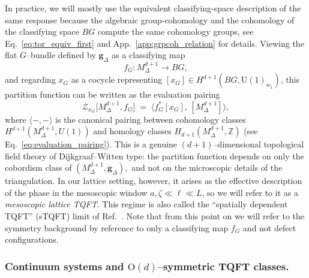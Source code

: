 \documentclass[aps,prx,reprint,superscriptaddress,twocolumn,amsmath,amssymb,amsfonts, nofootinbib]{revtex4-2}
\newcommand{\U}{\text{U}}
\theoremstyle{apsstyle}
\begin{document}
\bigskip 

In practice, we will mostly use the equivalent classifying-space description of the same response because the algebraic group-cohomology and the cohomology of the classifying space $BG$ compute the same cohomology groups, see Eq.~\ref{eq:tor_equiv_first} and App.~\ref{app:grpcoh_relation} for details.
Viewing the flat $G$–bundle defined by ${\mathbf g}_{\Delta}$ as a classifying map
\begin{equation*}
   f_G : M^{d+1}_{\Delta} \longrightarrow BG,
\end{equation*}
and regarding $x_G$ as a cocycle representing $[x_{G}]\in H^{d+1}(BG,\U(1)_{w_{1}})$, this partition function can be written as the evaluation pairing
\begin{equation*}    \mathcal{Z}_{x_G}\bigl[M^{d+1}_{\Delta}, f_{G}\bigr]
    \;=\;
    \big\langle f_G^{*}[x_G],\,[M^{d+1}_{\Delta}]\big\rangle,
\end{equation*}
where $\langle -,-\rangle$ is the canonical pairing between cohomology classes $H^{d+1}(M^{d+1}_{\Delta},U(1))$ and homology classes $H_{d+1}(M^{d+1}_{\Delta},\mathbb Z)$ (see Eq.~\ref{eq:evaluation_pairing}). This is a genuine $(d{+}1)$–dimensional topological field theory of Dijkgraaf–Witten type: the partition function depends on only the cobordism class of $(M^{d+1}_{\Delta},  {\mathbf g}_{\Delta}),$ and not on the microscopic details of the triangulation. In our lattice setting, however, it arises as the effective description of the phase in the mesoscopic window $a,\zeta \ll \ell \ll L$, so we will refer to it as a \emph{mesoscopic lattice TQFT}. This regime is also called the “spatially dependent TQFT” (sTQFT) limit of Ref.~\cite{ThorngrenElse}. Note that from this point on we will refer to the symmetry background by reference to only a classifying map $f_{G}$ and not defect configurations. 



\subsubsection{Continuum systems and $\mathrm{O}(d)$–symmetric TQFT classes.} 
\end{document}
